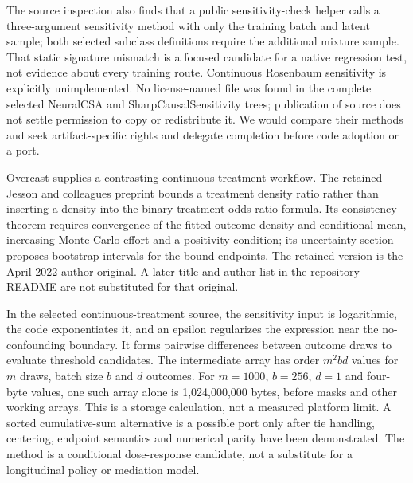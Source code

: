 The source inspection also finds that a public sensitivity-check helper calls a three-argument sensitivity method with only the training batch and latent sample; both selected subclass definitions require the additional mixture sample. That static signature mismatch is a focused candidate for a native regression test, not evidence about every training route. Continuous Rosenbaum sensitivity is explicitly unimplemented. No license-named file was found in the complete selected NeuralCSA and SharpCausalSensitivity trees; publication of source does not settle permission to copy or redistribute it. We would compare their methods and seek artifact-specific rights and delegate completion before code adoption or a port. \citep{exec25_pymed_neuralcsa,exec25_pymed_sharp,exec25_pymed_choice}

Overcast supplies a contrasting continuous-treatment workflow. The retained Jesson and colleagues preprint bounds a treatment density ratio rather than inserting a density into the binary-treatment odds-ratio formula. Its consistency theorem requires convergence of the fitted outcome density and conditional mean, increasing Monte Carlo effort and a positivity condition; its uncertainty section proposes bootstrap intervals for the bound endpoints. The retained version is the April 2022 author original. A later title and author list in the repository README are not substituted for that original. \citep{exec25_pymed_overcast_paper,exec25_pymed_overcast}

In the selected continuous-treatment source, the sensitivity input is logarithmic, the code exponentiates it, and an epsilon regularizes the expression near the no-confounding boundary. It forms pairwise differences between outcome draws to evaluate threshold candidates. The intermediate array has order $m^2bd$ values for $m$ draws, batch size $b$ and $d$ outcomes. For $m=1000$, $b=256$, $d=1$ and four-byte values, one such array alone is 1,024,000,000 bytes, before masks and other working arrays. This is a storage calculation, not a measured platform limit. A sorted cumulative-sum alternative is a possible port only after tie handling, centering, endpoint semantics and numerical parity have been demonstrated. The method is a conditional dose-response candidate, not a substitute for a longitudinal policy or mediation model. \citep{exec25_pymed_overcast,exec25_pymed_choice}

